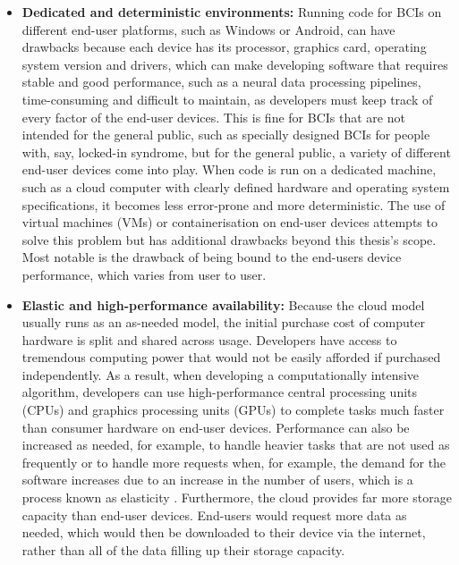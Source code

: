 \begin{itemize}
  \item \textbf{Dedicated and deterministic environments:} Running code for BCIs on different end-user platforms, such as Windows or Android, can have drawbacks because each device has its processor, graphics card, operating system version and drivers, which can make developing software that requires stable and good performance, such as a neural data processing pipelines, time-consuming and difficult to maintain, as developers must keep track of every factor of the end-user devices. This is fine for BCIs that are not intended for the general public, such as specially designed BCIs for people with, say, locked-in syndrome, but for the general public, a variety of different end-user devices come into play. When code is run on a dedicated machine, such as a cloud computer with clearly defined hardware and operating system specifications, it becomes less error-prone and more deterministic. The use of virtual machines (VMs) or containerisation on end-user devices attempts to solve this problem but has additional drawbacks beyond this thesis's scope. Most notable is the drawback of being bound to the end-users device performance, which varies from user to user.
  \item \textbf{Elastic and high-performance availability:} Because the cloud model usually runs as an as-needed model, the initial purchase cost of computer hardware is split and shared across usage. Developers have access to tremendous computing power that would not be easily afforded if purchased independently. As a result, when developing a computationally intensive algorithm, developers can use high-performance central processing units (CPUs) and graphics processing units (GPUs) to complete tasks much faster than consumer hardware on end-user devices. Performance can also be increased as needed, for example, to handle heavier tasks that are not used as frequently or to handle more requests when, for example, the demand for the software increases due to an increase in the number of users, which is a process known as elasticity \citep{gartner_definition_nodate}. Furthermore, the cloud provides far more storage capacity than end-user devices. End-users would request more data as needed, which would then be downloaded to their device via the internet, rather than all of the data filling up their storage capacity.


\end{itemize}
